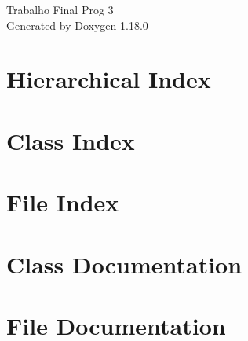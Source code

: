\documentclass[twoside]{book}
\newcommand{\+}{\discretionary{\mbox{\scriptsize$\hookleftarrow$}}{}{}}
\newcommand{\clearemptydoublepage}{%
    \newpage{\pagestyle{empty}\cleardoublepage}%
  }
\begin{document}
  \raggedbottom
    \hypersetup{pageanchor=false,
                bookmarksnumbered=true,
                pdfencoding=unicode
               }
  \begin{titlepage}
  \vspace*{7cm}
  \begin{center}%
  {\Large Trabalho Final Prog 3}\\
  \vspace*{1cm}
  {\large Generated by Doxygen 1.18.0}\\
  \end{center}
  \end{titlepage}
  \clearemptydoublepage
  \tableofcontents
  \clearemptydoublepage
  \hypersetup{pageanchor=true}
\chapter{Hierarchical Index}

\chapter{Class Index}

\chapter{File Index}

\chapter{Class Documentation}













\chapter{File Documentation}



  \backmatter
  \newpage
  \clearemptydoublepage
  \printindex
\end{document}
